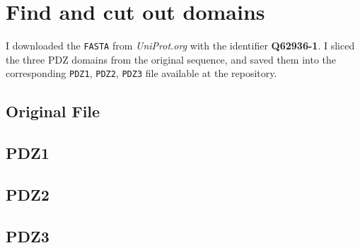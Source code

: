 \chapter{Find and cut out domains}
I downloaded the \texttt{FASTA} from \emph{UniProt.org} with the identifier
\textbf{Q62936-1}. I sliced the three PDZ domains from the original sequence, and saved them into the corresponding \texttt{PDZ1}, \texttt{PDZ2}, \texttt{PDZ3} file available at the repository.

\section{Original File}


\section{PDZ1}


\clearpage
\section{PDZ2}



\section{PDZ3}
